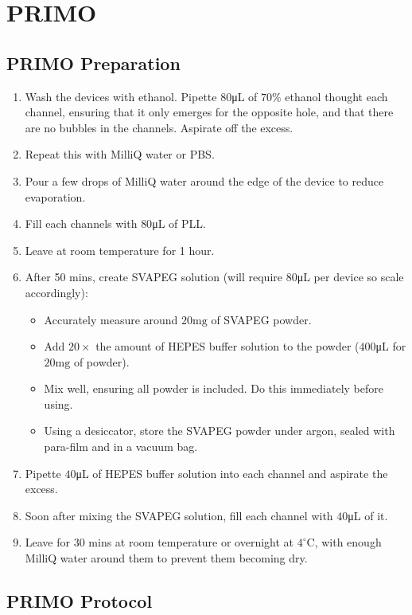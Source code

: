 \section{PRIMO}

\subsection*{PRIMO Preparation}

\begin{enumerate}
	 \setlength\itemsep{-0.1em}
	\item Wash the devices with ethanol. Pipette $80  $\unit{\uL} of $70\%$ ethanol thought each channel, ensuring that it only emerges for the opposite hole, and that there are no bubbles in the channels. Aspirate off the excess.
	\item Repeat this with MilliQ water or PBS.
	\item Pour a few drops of MilliQ water around the edge of the device to reduce evaporation.
	\item Fill each channels with $80  $\unit{\uL} of PLL.
	\item Leave at room temperature for 1 hour.
	\item After 50 mins, create SVAPEG solution (will require $80  $\unit{\uL} per device so scale accordingly):
	\begin{itemize}
		 \setlength\itemsep{-0.1em}
		\item Accurately measure around $20  \text{mg}$ of SVAPEG powder.
		\item Add $20 \times$ the amount of HEPES buffer solution to the powder ($400  $\unit{\uL} for $20  \text{mg}$ of powder). 
		\item Mix well, ensuring all powder is included. Do this immediately before using.
		\item Using a desiccator, store the SVAPEG powder under argon, sealed with para-film and in a vacuum bag.
	\end{itemize}
	\item Pipette $40  $\unit{\uL} of HEPES buffer solution into each channel and aspirate the excess.
	\item Soon after mixing the SVAPEG solution, fill each channel with $40  $\unit{\uL} of it.
	\item Leave for 30 mins at room temperature or overnight at $4^{\circ}$C, with enough MilliQ water around them to prevent them becoming dry.
\end{enumerate}

\subsection*{PRIMO Protocol}

